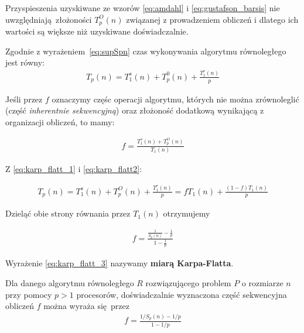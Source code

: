 Przyspieszenia uzyskiwane ze wzorów \eqref{eq:amdahl} i \eqref{eq:gustafson_barsis} nie uwzględniają złożoności \(T_{p}^{O}(n)\) związanej z prowadzeniem obliczeń i dlatego ich wartości są większe niż uzyskiwane doświadczalnie.

Zgodnie z wyrażeniem \ref{eq:supSpn} czas wykonywania algorytmu równoległego jest równy:
\begin{align}\label{eq:karp_flatt_1}
T_{p}(n)=T_{1}^{s}(n)+T_{p}^{0}(n) + \frac{T_{1}^{r}(n)}{p}
\end{align}

Jeśli przez \(f\) oznaczymy częśc operacji algorytmu, których nie można zrównoleglić (część \emph{inherentnie sekwencyjną}) oraz złożoność dodatkową wynikającą z organizacji obliczeń, to mamy:

\begin{align}
f=\frac{T_{1}^{s}(n)+T_{p}^{O}(n)}{T_{1}(n)}\label{eq:karp_flatt2}
\end{align}

Z \eqref{eq:karp_flatt_1} i \eqref{eq:karp_flatt2}:

\begin{align}
T_{p}(n)=T_{1}^{s}(n)+T_{p}^{O}(n)+\frac{T_{1}^{r}(n)}{p} = fT_{1}(n)+\frac{(1-f)T_{1}(n)}{p}
\end{align}

Dzieląć obie strony równania przez \(T_{1}(n)\) otrzymujemy

\begin{align}\label{eq:karp_flatt_3}
f=\frac{\frac{1}{S_{p}(n)}-\frac{1}{p}}{1-\frac{1}{p}}
\end{align}

Wyrażenie \eqref{eq:karp_flatt_3} nazywamy \textbf{miarą Karpa-Flatta}.

\begin{definicja}
Dla danego algorytmu równoległego \(R\) rozwiązującego problem \(P\) o rozmiarze \(n\) przy pomocy \(p>1\) procesorów, doświadczalnie wyznaczona część sekwencyjna obliczeń \(f\) można wyraża się przez
\begin{align}
f = \frac{1/S_{p}(n) - 1/p}{1 - 1/p}
\end{align}
\end{definicja}
